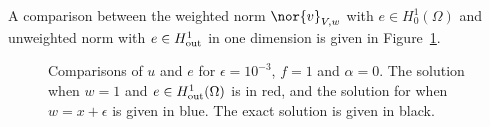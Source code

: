 A comparison between the weighted norm $\nor{v}_{V,w}$ with $e\in H^1_0(\Omega)$ and unweighted norm with $e\in H^1_{\rm out}$ in one dimension is given in Figure~\ref{fig:robustComparison1D}.  
\begin{figure}[!h]
\centering
{}
\caption{Comparisons of $u$ and $e$ for $\epsilon = 10^{-3}$, $f=1$ and $\alpha = 0$. The solution when $w = 1$ and $e\in H^1_{\rm out}(\Omega)$ is in red, and the solution for when $w = x+\epsilon$ is given in blue.  The exact solution is given in black.}
\label{fig:robustComparison1D}
\end{figure}

